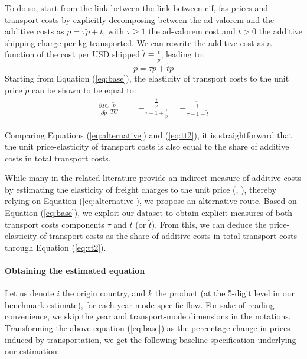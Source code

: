 \documentclass[a4paper,11pt]{article}
\begin{document}
To do so, start from the link between the link between cif, fas prices and transport costs by explicitly decomposing between the ad-valorem and the additive costs as $p = \tau \widetilde{p}+ t$, with $\tau \geq 1$ the ad-valorem cost and $t>0 $ the additive shipping charge per kg transported. We can rewrite the additive cost as a function of the cost per USD shipped $\widetilde{t} \equiv \frac{t}{\widetilde{p}}$, leading to:
\begin{equation}
p = \tau \widetilde{p}+ \widetilde{t}\widetilde{p}  \label{eq:base}
\end{equation}
Starting from Equation (\ref{eq:base}), the elasticity of transport costs to the unit price $\widetilde{p}$ can be shown to be equal to:
\begin{eqnarray}
\frac{\partial TC}{\partial \widetilde{p}} \frac{\tilde{p}}{TC}&=& -\frac{\frac{t}{\tilde{p}}}{\tau -1  +\frac{t}{\tilde{p}}} = -\frac{\widetilde{t}}{\tau-1 +\widetilde{t}} \label{eq:tt2}
\end{eqnarray}

Comparing Equations (\ref{eq:alternative}) and (\ref{eq:tt2}), it is straightforward that the unit price-elasticity of transport costs is also equal to the share of additive costs in total transport costs.

While many in the related literature provide an indirect measure of additive costs by estimating the elasticity of freight charges to the unit price (\citealp{hummels_skiba}, \citealp{Lashkaripour-2017}), thereby relying on Equation (\ref{eq:alternative}), we propose an alternative route. Based on Equation (\ref{eq:base}), we exploit our dataset to obtain explicit measures of both transport costs components $\tau$ and $t$ (or $\widetilde{t}$). From this, we can deduce the price-elasticity of transport costs as the share of additive costs in total transport costs through Equation (\ref{eq:tt2}).



\paragraph{Obtaining the estimated equation} Let us denote $i$ the origin country, and $k$ the product (at the 5-digit level in our benchmark estimate), for each year-mode specific flow. For sake of reading convenience, we skip the year and transport-mode dimensions in the notations. Transforming the above equation (\ref{eq:base}) as the percentage change in prices induced by transportation, we get the following baseline specification underlying our estimation:
\end{document}
